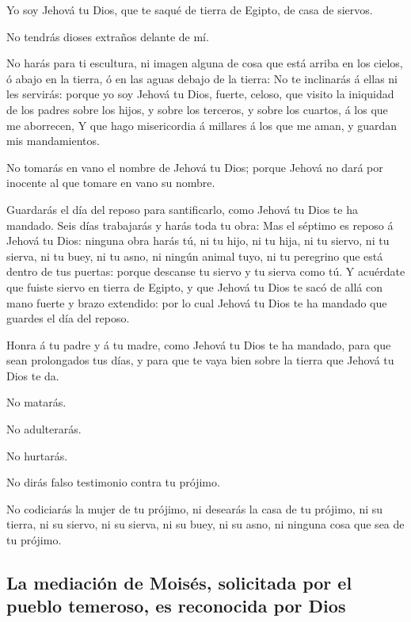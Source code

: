  Yo soy Jehová tu Dios, que te saqué de tierra de Egipto, de
casa de siervos.

 No tendrás dioses extraños delante de mí.

 No harás para ti escultura, ni imagen alguna de cosa que
está arriba en los cielos, ó abajo en la tierra, ó en las aguas debajo
de la tierra:  No te inclinarás á ellas ni les servirás:
porque yo soy Jehová tu Dios, fuerte, celoso, que visito la iniquidad de
los padres sobre los hijos, y sobre los terceros, y sobre los cuartos, á
los que me aborrecen,  Y que hago misericordia á millares á
los que me aman, y guardan mis mandamientos.

 No tomarás en vano el nombre de Jehová tu Dios; porque
Jehová no dará por inocente al que tomare en vano su nombre.

 Guardarás el día del reposo para santificarlo, como Jehová
tu Dios te ha mandado.  Seis días trabajarás y harás toda
tu obra:  Mas el séptimo es reposo á Jehová tu Dios:
ninguna obra harás tú, ni tu hijo, ni tu hija, ni tu siervo, ni tu
sierva, ni tu buey, ni tu asno, ni ningún animal tuyo, ni tu peregrino
que está dentro de tus puertas: porque descanse tu siervo y tu sierva
como tú.  Y acuérdate que fuiste siervo en tierra de
Egipto, y que Jehová tu Dios te sacó de allá con mano fuerte y brazo
extendido: por lo cual Jehová tu Dios te ha mandado que guardes el día
del reposo.

 Honra á tu padre y á tu madre, como Jehová tu Dios te ha
mandado, para que sean prolongados tus días, y para que te vaya bien
sobre la tierra que Jehová tu Dios te da.

 No matarás.

 No adulterarás.

 No hurtarás.

 No dirás falso testimonio contra tu prójimo.

 No codiciarás la mujer de tu prójimo, ni desearás la casa
de tu prójimo, ni su tierra, ni su siervo, ni su sierva, ni su buey, ni
su asno, ni ninguna cosa que sea de tu prójimo.

\hypertarget{la-mediaciuxf3n-de-moisuxe9s-solicitada-por-el-pueblo-temeroso-es-reconocida-por-dios}{%
\subsection{La mediación de Moisés, solicitada por el pueblo temeroso,
es reconocida por
Dios}\label{la-mediaciuxf3n-de-moisuxe9s-solicitada-por-el-pueblo-temeroso-es-reconocida-por-dios}}

